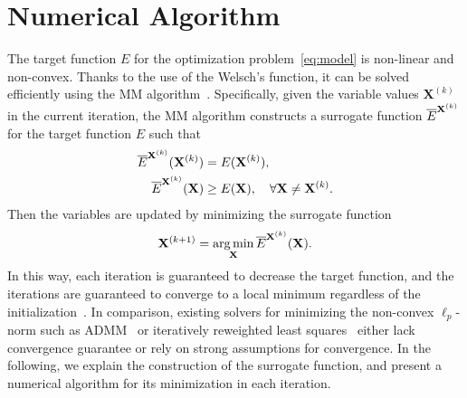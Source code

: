 \section{Numerical Algorithm}
The target function $E$ for the optimization problem~\eqref{eq:model} is non-linear and non-convex.
Thanks to the use of the Welsch's function, it can be solved efficiently using the MM algorithm~\cite{Lange2004}. Specifically, given the variable values $\mathbf{X}^{(k)}$ in the current iteration, the MM algorithm constructs a surrogate function $\overline{E}^{\mathbf{X}^{(k)}}$ for the target function $E$ such that
\begin{equation}
\label{eq:SurrogateE}
\begin{aligned}
\overline{E}^{\mathbf{X}^{(k)}}(\mathbf{X}^{(k)}) & = E(\mathbf{X}^{(k)}),\\
\overline{E}^{\mathbf{X}^{(k)}}(\mathbf{X}) &\geq E(\mathbf{X}), \quad \forall \mathbf{X} \neq \mathbf{X}^{(k)}.
\end{aligned}
\end{equation}
Then the variables are updated by minimizing the surrogate function
\begin{equation}
    \mathbf{X}^{(k+1)} = \operatorname*{arg\,min}_{\mathbf{X}} \overline{E}^{\mathbf{X}^{(k)}}(\mathbf{X}).
\end{equation}
In this way, each iteration is guaranteed to decrease the target function, and the iterations are guaranteed to converge to a local minimum regardless of the initialization~\cite{Lange2004}. In comparison, existing solvers for minimizing the non-convex $\ell_p$-norm such as ADMM~\cite{Bouaziz2013-SparseICP} or iteratively reweighted least squares~\cite{Daubechies2010} either lack convergence guarantee or rely on strong assumptions for convergence.  In the following, we explain the construction of the surrogate function, and present a numerical algorithm for its minimization in each iteration.


